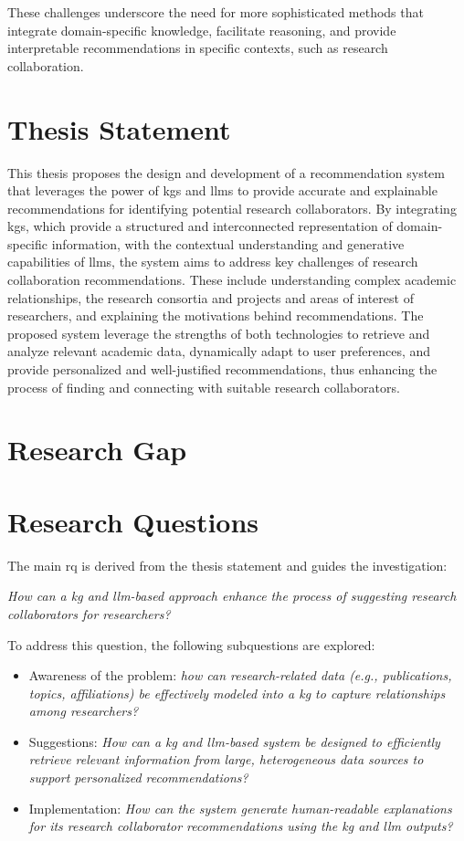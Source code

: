 These challenges underscore the need for more sophisticated methods that integrate domain-specific knowledge, facilitate reasoning, and provide interpretable recommendations in specific contexts, such as research collaboration.
%
\section{Thesis Statement}\label{sec:thesis-statement}

This thesis proposes the design and development of a recommendation system that leverages the power of \glspl{kg} and \glspl{llm} to provide accurate and explainable recommendations for identifying potential research collaborators.
By integrating \glspl{kg}, which provide a structured and interconnected representation of domain-specific information, with the contextual understanding and generative capabilities of \glspl{llm}, the system aims to address key challenges of research collaboration recommendations.
These include understanding complex academic relationships, the research consortia and projects and areas of interest of researchers, and explaining the motivations behind recommendations.
The proposed system leverage the strengths of both technologies to retrieve and analyze relevant academic data, dynamically adapt to user preferences, and provide personalized and well-justified recommendations, thus enhancing the process of finding and connecting with suitable research collaborators.
%
\section{Research Gap}\label{sec:research-gap}

%
\section{Research Questions}\label{sec:research-questions}
The main \gls{rq} is derived from the thesis statement and guides the investigation:

\textit{How can a \gls{kg} and \gls{llm}-based approach enhance the process of suggesting research collaborators for researchers?}

To address this question, the following subquestions are explored:
\begin{itemize}
	\item Awareness of the problem: \textit{how can research-related data (e.g., publications, topics, affiliations) be effectively modeled into a \gls{kg} to capture relationships among researchers?}
	\item Suggestions: \textit{How can a \gls{kg} and \gls{llm}-based system be designed to efficiently retrieve relevant information from large, heterogeneous data sources to support personalized recommendations?}
	\item Implementation: \textit{How can the system generate human-readable explanations for its research collaborator recommendations using the \gls{kg} and \gls{llm} outputs?}
\end{itemize}

